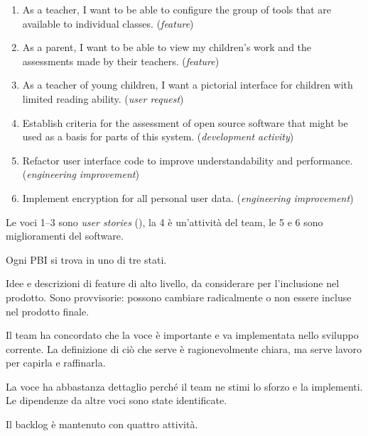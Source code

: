 \begin{esempio}
\begin{enumerate}
  \item As a teacher, I want to be able to configure the group of tools that are available to individual classes.
    (\emph{feature})
  \item As a parent, I want to be able to view my children's work and the assessments made by their teachers.
    (\emph{feature})
  \item As a teacher of young children, I want a pictorial interface for children with limited reading ability.
    (\emph{user request})
  \item Establish criteria for the assessment of open source software that might be used as a basis for parts of
    this system. (\emph{development activity})
  \item Refactor user interface code to improve understandability and performance. (\emph{engineering improvement})
  \item Implement encryption for all personal user data. (\emph{engineering improvement})
\end{enumerate}
Le voci 1--3 sono \emph{user stories} (), la 4 è un'attività del team, le 5 e 6 sono
miglioramenti del software.
\end{esempio}

Ogni PBI si trova in uno di tre stati.

\begin{description}[leftmargin=0pt, style=unboxed]
  \item[Ready for consideration.] Idee e descrizioni di feature di alto livello, da considerare per l'inclusione nel
    prodotto. Sono provvisorie: possono cambiare radicalmente o non essere incluse nel prodotto finale.
  \item[Ready for refinement.] Il team ha concordato che la voce è importante e va implementata nello sviluppo
    corrente. La definizione di ciò che serve è ragionevolmente chiara, ma serve lavoro per capirla e raffinarla.
  \item[Ready for implementation.] La voce ha abbastanza dettaglio perché il team ne stimi lo sforzo e la
    implementi. Le dipendenze da altre voci sono state identificate.
\end{description}

Il backlog è mantenuto con quattro attività.

